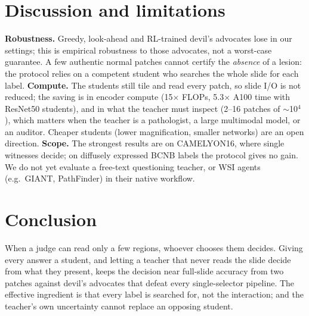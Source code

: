 \documentclass[10pt,twocolumn,letterpaper]{article}
\begin{document}
\section{Discussion and limitations}\label{sec:discussion}
\textbf{Robustness.} Greedy, look-ahead and RL-trained devil's advocates lose in our settings; this is empirical robustness to those advocates, not a worst-case guarantee. A few authentic normal patches cannot certify the \emph{absence} of a lesion: the protocol relies on a competent student who searches the whole slide for each label. \textbf{Compute.} The students still tile and read every patch, so slide I/O is not reduced; the saving is in encoder compute (15$\times$ FLOPs, 5.3$\times$ A100 time with ResNet50 students), and in what the teacher must inspect (2--16 patches of $\sim$10$^4$), which matters when the teacher is a pathologist, a large multimodal model, or an auditor. Cheaper students (lower magnification, smaller networks) are an open direction. \textbf{Scope.} The strongest results are on CAMELYON16, where single witnesses decide; on diffusely expressed BCNB labels the protocol gives no gain. We do not yet evaluate a free-text questioning teacher, or WSI agents (e.g.\ GIANT, PathFinder) in their native workflow.

\section{Conclusion}
When a judge can read only a few regions, whoever chooses them decides. Giving every answer a student, and letting a teacher that never reads the slide decide from what they present, keeps the decision near full-slide accuracy from two patches against devil's advocates that defeat every single-selector pipeline. The effective ingredient is that every label is searched for, not the interaction; and the teacher's own uncertainty cannot replace an opposing student.

{\small}
\end{document}
